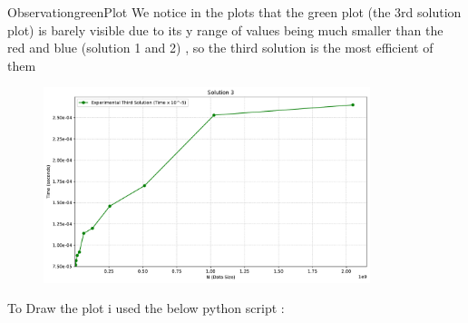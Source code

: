 

\vspace{1cm}

\begin{prettyBox}{Observation}{greenPlot}
We notice in the plots that the green plot (the 3rd solution plot) is barely visible due to its y range of values
being much smaller than the red and blue (solution 1 and 2) , so the third solution is the most efficient of them 
\end{prettyBox}

\newpage

\begin{figure}[h!]
    \centering
    \includegraphics[width=0.85\textwidth]{Questions/Part3/sqrt.pdf}
    \label{fig:time_plot}
\end{figure}

\newpage

To Draw the plot i used the below python script :

\vspace{1cm}




